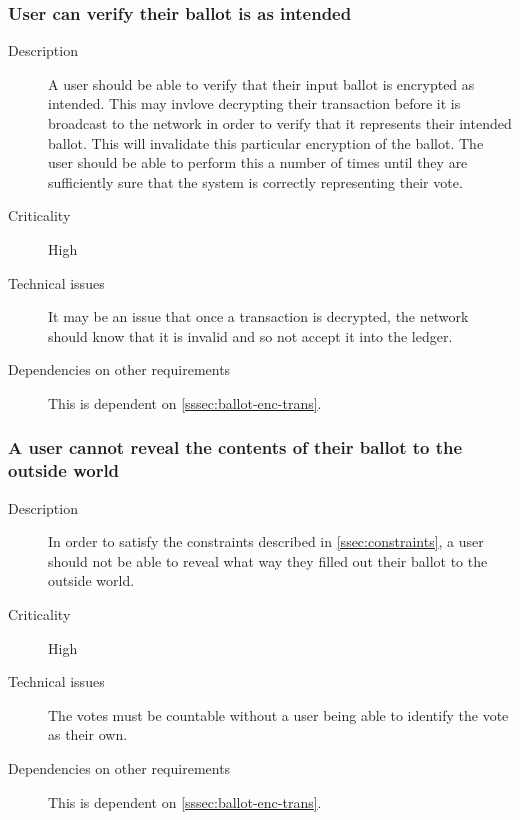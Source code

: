 \documentclass[a4paper,12pt]{article}
\begin{document}
\subsubsection{User can verify their ballot is as intended}
\begin{description}
	\item[Description]
		A user should be able to verify that their input ballot is encrypted as intended. This may invlove decrypting their transaction before it is broadcast to the network in order to verify that it represents their intended ballot. This will invalidate this particular encryption of the ballot. The user should be able to perform this a number of times until they are sufficiently sure that the system is correctly representing their vote.
	\item[Criticality]
		High
	\item[Technical issues]
		It may be an issue that once a transaction is decrypted, the network should know that it is invalid and so not accept it into the ledger.
	\item[Dependencies on other requirements]
		This is dependent on \ref{sssec:ballot-enc-trans}.
\end{description}

\subsubsection{A user cannot reveal the contents of their ballot to the outside world}
\begin{description}
	\item[Description]
		In order to satisfy the constraints described in \ref{ssec:constraints}, a user should not be able to reveal what way they filled out their ballot to the outside world.
	\item[Criticality]
		High
	\item[Technical issues]
		The votes must be countable without a user being able to identify the vote as their own.
	\item[Dependencies on other requirements]
		This is dependent on \ref{sssec:ballot-enc-trans}.
\end{description}
\end{document}
